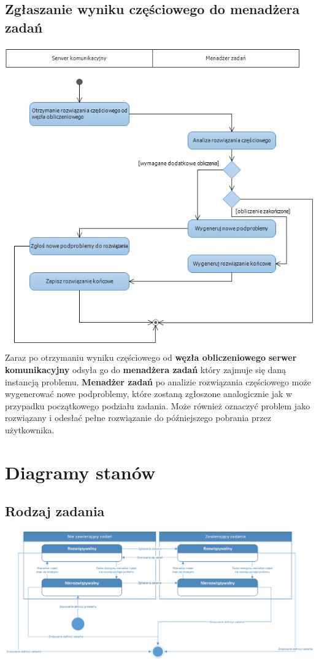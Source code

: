 \documentclass[12pt,a4paper,titlepage]{report}
\begin{document}
		\section{Zgłaszanie wyniku częściowego do menadżera zadań}
		\includegraphics[width=\textwidth]{img/diagram_cstm_submitsubtasksolution.png}
		Zaraz po otrzymaniu wyniku częściowego od \textbf{węzła obliczeniowego} \textbf{serwer komunikacyjny}
		odsyła go do \textbf{menadżera zadań} który zajmuje się daną instancją problemu. \textbf{Menadżer zadań}
		po analizie rozwiązania częściowego może wygenerować nowe podproblemy, które zostaną zgłoszone analogicznie
		jak w przypadku początkowego podziału zadania. Może również oznaczyć problem jako rozwiązany i odesłać
		pełne rozwiązanie do późniejszego pobrania przez użytkownika.
		
	\chapter{Diagramy stanów}
		\section{Rodzaj zadania}
		\includegraphics[width=\textwidth]{img/state/Problem.png}
		
\end{document}
